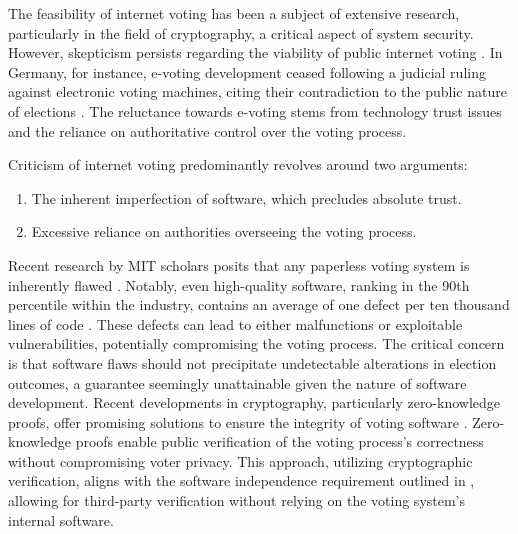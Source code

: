 \documentclass[runningheads]{llncs}
\begin{document}
The feasibility of internet voting has been a subject of extensive research, particularly in the field of cryptography, a critical aspect of system security. However, skepticism persists regarding the viability of public internet voting \cite{parkGoingBadWorse2021, mearianWhyBlockchainbasedVoting2019, shanklandNoBlockchainIsn2018, leeBlockchainbasedElectionsWould2018, schneierBlockchainVoting2020, schneierBlockchainTrust2019}. In Germany, for instance, e-voting development ceased following a judicial ruling against electronic voting machines, citing their contradiction to the public nature of elections \cite{ElectronicVotingCountry2023}. The reluctance towards e-voting stems from technology trust issues and the reliance on authoritative control over the voting process.

Criticism of internet voting predominantly revolves around two arguments:

\begin{enumerate}
\item The inherent imperfection of software, which precludes absolute trust.
\item Excessive reliance on authorities overseeing the voting process.
\end{enumerate}

Recent research by MIT scholars posits that any paperless voting system is inherently flawed \cite{parkGoingBadWorse2021}. Notably, even high-quality software, ranking in the 90th percentile within the industry, contains an average of one defect per ten thousand lines of code \cite{llaguno2017CoverityScan2017}. These defects can lead to either malfunctions or exploitable vulnerabilities, potentially compromising the voting process. The critical concern is that software flaws should not precipitate undetectable alterations in election outcomes, a guarantee seemingly unattainable given the nature of software development.
Recent developments in cryptography, particularly zero-knowledge proofs, offer promising solutions to ensure the integrity of voting software \cite{parnoPinocchioNearlyPractical2013}. Zero-knowledge proofs enable public verification of the voting process's correctness without compromising voter privacy. This approach, utilizing cryptographic verification, aligns with the software independence requirement outlined in \cite{parkGoingBadWorse2021}, allowing for third-party verification without relying on the voting system's internal software.
\end{document}
